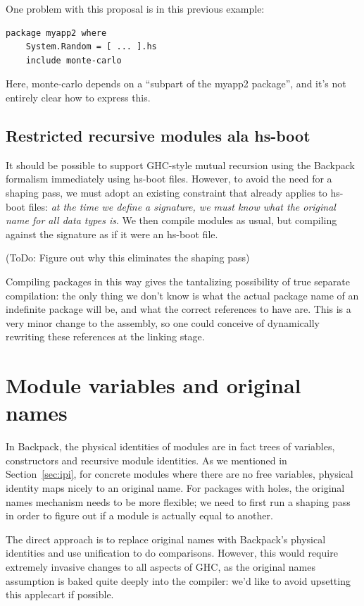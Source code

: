 \documentclass{article}
\begin{document}
One problem with this proposal is in this previous example:

\begin{verbatim}
package myapp2 where
    System.Random = [ ... ].hs
    include monte-carlo
\end{verbatim}

Here, monte-carlo depends on a ``subpart of the myapp2 package'', and it's
not entirely clear how to express this.

\subsection{Restricted recursive modules ala hs-boot}

It should be possible to support GHC-style mutual recursion using the
Backpack formalism immediately using hs-boot files.  However, to avoid
the need for a shaping pass, we must adopt an existing constraint that
already applies to hs-boot files: \emph{at the time we define a signature,
we must know what the original name for all data types is}.  We then
compile modules as usual, but compiling against the signature as if it
were an hs-boot file.

(ToDo: Figure out why this eliminates the shaping pass)

Compiling packages in this way gives the tantalizing possibility
of true separate compilation: the only thing we don't know is what the actual
package name of an indefinite package will be, and what the correct references
to have are.  This is a very minor change to the assembly, so one could conceive
of dynamically rewriting these references at the linking stage.

\iffalse%

\section{Module variables and original names}\label{sec:variables}

In Backpack, the physical identities of modules are in fact trees of
variables, constructors and recursive module identities.  As we
mentioned in Section~\ref{sec:ipi}, for concrete modules where there are
no free variables, physical identity maps nicely to an original name.
For packages with holes, the original names mechanism needs to be more
flexible; we need to first run a shaping pass in order to figure out if
a module is actually equal to another.

The direct approach is to replace original names with Backpack's
physical identities and use unification to do comparisons.  However,
this would require extremely invasive changes to all aspects of GHC, as
the original names assumption is baked quite deeply into the compiler:
we'd like to avoid upsetting this applecart if possible.
\end{document}
